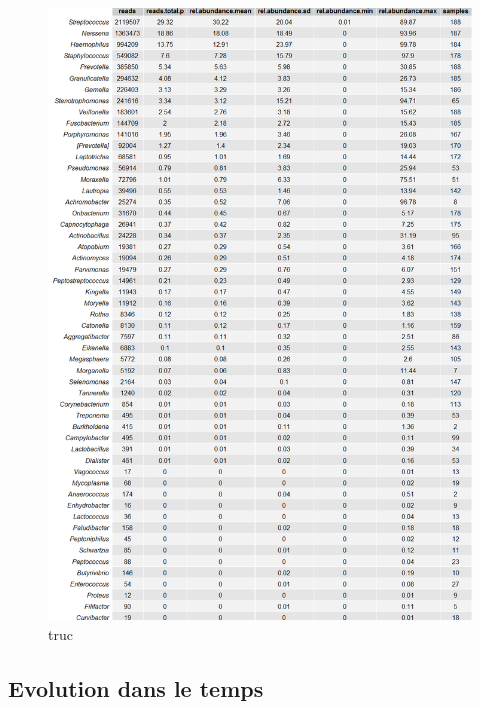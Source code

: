 \documentclass[12pt,a4paper]{article}
\begin{document}
\begin{figure}[h]
\begin{center}
\includegraphics[scale=0.5]{img/all_table.png}\hfill
\end{center}
\caption{truc}
\label{bigtable}
\end{figure}

\subsection{Evolution dans le temps}
\end{document}
